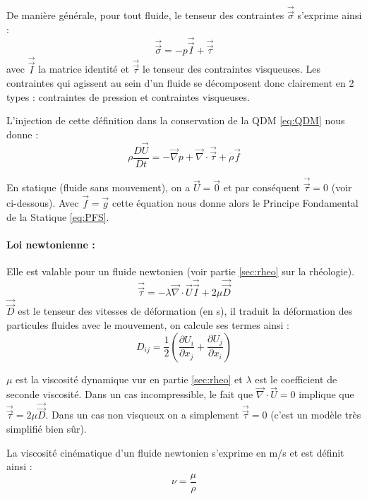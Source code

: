 
De manière générale, pour tout fluide, le tenseur des contraintes $\vec{\vec{\sigma}}$ s'exprime ainsi :
%
\begin{equation}
\vec{\vec{\sigma}} = - p \vec{\vec{I}} + \vec{\vec{\tau}}
\end{equation}
%
avec $\vec{\vec{I}}$ la matrice identité et $\vec{\vec{\tau}}$ le tenseur des contraintes visqueuses. Les contraintes qui agissent au sein d'un fluide se décomposent donc clairement en 2 types : contraintes de pression et contraintes visqueuses.

L'injection de cette définition dans la conservation de la QDM \eqref{eq:QDM} nous donne :
%
\begin{equation}
\rho \frac{D\vec{U}}{Dt} = - \vec{\nabla} p + \vec{\nabla} \cdot \vec{\vec{\tau}} + \rho \vec{f}
\end{equation}

En statique (fluide sans mouvement), on a $\vec{U} = \vec{0}$ et par conséquent $\vec{\vec{\tau}} = 0$ (voir ci-dessous). Avec $\vec{f} = \vec{g}$ cette équation nous donne alors le Principe Fondamental de la Statique \eqref{eq:PFS}.

\paragraph{Loi newtonienne :}Elle est valable pour un fluide newtonien (voir partie \ref{sec:rheo} sur la rhéologie).
%
\begin{equation}
\vec{\vec{\tau}} = - \lambda \vec{\nabla} \cdot \vec{U} \vec{\vec{I}} + 2\mu \vec{\vec{D}}
\end{equation}
%
$\vec{\vec{D}}$ est le tenseur des vitesses de déformation (en s), il traduit la déformation des particules fluides avec le mouvement, on calcule ses termes ainsi :
%
\begin{equation}
D_{ij} = \frac{1}{2} \left( \frac{\partial{U_i}}{\partial{x_j}} + \frac{\partial{U_j}}{\partial{x_i}} \right)
\end{equation}

$\mu$ est la viscosité dynamique vur en partie \ref{sec:rheo} et $\lambda$ est le coefficient de seconde viscosité. Dans un cas incompressible, le fait que $\vec{\nabla} \cdot \vec{U} = 0$ implique que $\vec{\vec{\tau}} = 2 \mu \vec{\vec{D}}$. Dans un cas non visqueux on a simplement $\vec{\vec{\tau}} = 0$ (c'est un modèle très simplifié bien sûr).

La viscosité cinématique d'un fluide newtonien s'exprime en m/s et est définit ainsi :
%
\begin{equation}
\nu = \frac{\mu}{\rho}
\end{equation}

